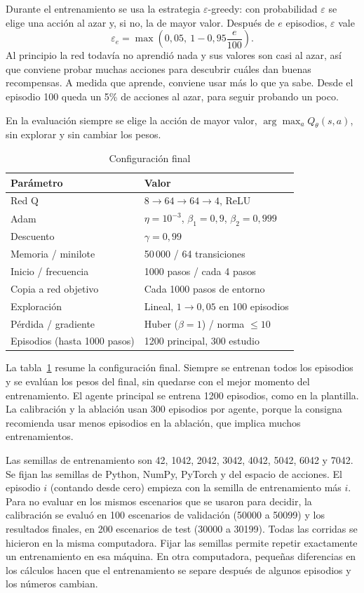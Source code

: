 \documentclass[conference]{IEEEtran}
\begin{document}
Durante el entrenamiento se usa la estrategia $\varepsilon$-greedy: con probabilidad $\varepsilon$ se elige una acción al azar y, si no, la de mayor valor. Después de $e$ episodios, $\varepsilon$ vale
\begin{equation}
 \varepsilon_e=\max\left(0{,}05,\ 1-0{,}95\frac{e}{100}\right).
\end{equation}
Al principio la red todavía no aprendió nada y sus valores son casi al azar, así que conviene probar muchas acciones para descubrir cuáles dan buenas recompensas. A medida que aprende, conviene usar más lo que ya sabe. Desde el episodio 100 queda un 5\% de acciones al azar, para seguir probando un poco.

En la evaluación siempre se elige la acción de mayor valor, $\arg\max_a Q_\theta(s,a)$, sin explorar y sin cambiar los pesos.

\begin{table}[t]
\caption{Configuración final}
\label{tab:hiper}
\centering
\begin{tabular}{@{}ll@{}}
\toprule
Parámetro & Valor \\
\midrule
Red Q & $8\to64\to64\to4$, ReLU \\
Adam & $\eta=10^{-3}$, $\beta_1=0{,}9$, $\beta_2=0{,}999$ \\
Descuento & $\gamma=0{,}99$ \\
Memoria / minilote & 50\,000 / 64 transiciones \\
Inicio / frecuencia & 1000 pasos / cada 4 pasos \\
Copia a red objetivo & Cada 1000 pasos de entorno \\
Exploración & Lineal, $1\to0{,}05$ en 100 episodios \\
Pérdida / gradiente & Huber ($\beta=1$) / norma $\leq10$ \\
Episodios (hasta 1000 pasos) & 1200 principal, 300 estudio \\
\bottomrule
\end{tabular}
\end{table}

La tabla~\ref{tab:hiper} resume la configuración final. Siempre se entrenan todos los episodios y se evalúan los pesos del final, sin quedarse con el mejor momento del entrenamiento. El agente principal se entrena 1200 episodios, como en la plantilla. La calibración y la ablación usan 300 episodios por agente, porque la consigna recomienda usar menos episodios en la ablación, que implica muchos entrenamientos.

Las semillas de entrenamiento son 42, 1042, 2042, 3042, 4042, 5042, 6042 y 7042. Se fijan las semillas de Python, NumPy, PyTorch y del espacio de acciones. El episodio $i$ (contando desde cero) empieza con la semilla de entrenamiento más $i$. Para no evaluar en los mismos escenarios que se usaron para decidir, la calibración se evaluó en 100 escenarios de validación (50000 a 50099) y los resultados finales, en 200 escenarios de test (30000 a 30199). Todas las corridas se hicieron en la misma computadora. Fijar las semillas permite repetir exactamente un entrenamiento en esa máquina. En otra computadora, pequeñas diferencias en los cálculos hacen que el entrenamiento se separe después de algunos episodios y los números cambian.
\end{document}
